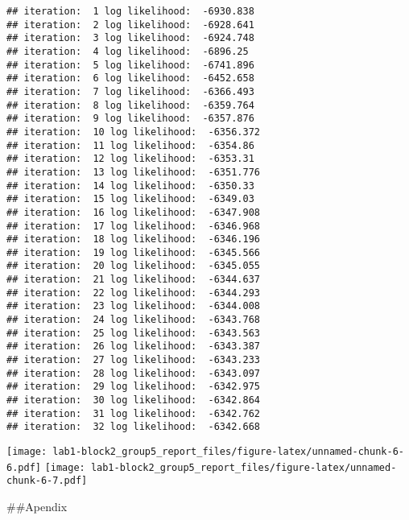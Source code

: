\documentclass[]{article}
\begin{document}
\begin{verbatim}
## iteration:  1 log likelihood:  -6930.838 
## iteration:  2 log likelihood:  -6928.641 
## iteration:  3 log likelihood:  -6924.748 
## iteration:  4 log likelihood:  -6896.25 
## iteration:  5 log likelihood:  -6741.896 
## iteration:  6 log likelihood:  -6452.658 
## iteration:  7 log likelihood:  -6366.493 
## iteration:  8 log likelihood:  -6359.764 
## iteration:  9 log likelihood:  -6357.876 
## iteration:  10 log likelihood:  -6356.372 
## iteration:  11 log likelihood:  -6354.86 
## iteration:  12 log likelihood:  -6353.31 
## iteration:  13 log likelihood:  -6351.776 
## iteration:  14 log likelihood:  -6350.33 
## iteration:  15 log likelihood:  -6349.03 
## iteration:  16 log likelihood:  -6347.908 
## iteration:  17 log likelihood:  -6346.968 
## iteration:  18 log likelihood:  -6346.196 
## iteration:  19 log likelihood:  -6345.566 
## iteration:  20 log likelihood:  -6345.055 
## iteration:  21 log likelihood:  -6344.637 
## iteration:  22 log likelihood:  -6344.293 
## iteration:  23 log likelihood:  -6344.008 
## iteration:  24 log likelihood:  -6343.768 
## iteration:  25 log likelihood:  -6343.563 
## iteration:  26 log likelihood:  -6343.387 
## iteration:  27 log likelihood:  -6343.233 
## iteration:  28 log likelihood:  -6343.097 
## iteration:  29 log likelihood:  -6342.975 
## iteration:  30 log likelihood:  -6342.864 
## iteration:  31 log likelihood:  -6342.762 
## iteration:  32 log likelihood:  -6342.668
\end{verbatim}

\texttt{[image: lab1-block2\_group5\_report\_files/figure-latex/unnamed-chunk-6-6.pdf]}
\texttt{[image: lab1-block2\_group5\_report\_files/figure-latex/unnamed-chunk-6-7.pdf]}

\#\#Apendix
\end{document}
